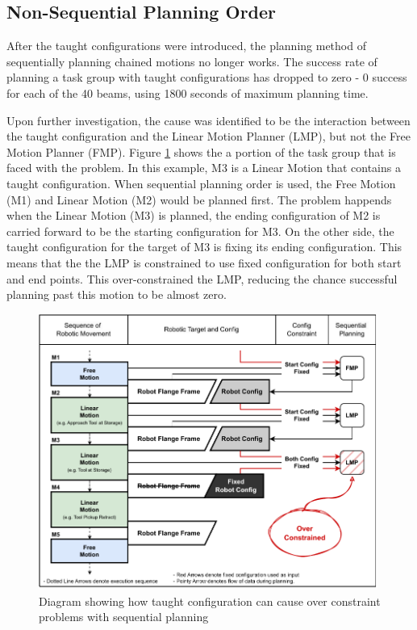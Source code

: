 \subsection{Non-Sequential Planning Order}
\label{subsection:exploration-3-non-sequential-planning-order}

After the taught configurations were introduced, the planning method of sequentially planning chained motions no longer works. The success rate of planning a task group with taught configurations has dropped to zero - 0 success for each of the 40 beams, using 1800 seconds of maximum planning time. 

Upon further investigation, the cause was identified to be the interaction between the taught configuration and the Linear Motion Planner (LMP), but not the Free Motion Planner (FMP). Figure \ref{fig:taught-configurations-over-constraint} shows the a portion of the task group that is faced with the problem. In this example, M3 is a Linear Motion that contains a taught configuration. When sequential planning order is used, the Free Motion (M1) and Linear Motion (M2) would be planned first. The problem happends when the Linear Motion (M3) is planned, the ending configuration of M2 is carried forward to be the starting configuration for M3. On the other side, the taught configuration for the target of M3 is fixing its ending configuration. This means that the the LMP is constrained to use fixed configuration for both start and end points. This over-constrained the LMP, reducing the chance successful planning past this motion to be almost zero.

\begin{figure}[!h]
    \centering
    \includegraphics[width=0.99\textwidth]{images/6a/image5.pdf}
    \caption{Diagram showing how taught configuration can cause over constraint problems with sequential planning}
    \label{fig:taught-configurations-over-constraint}
\end{figure}

